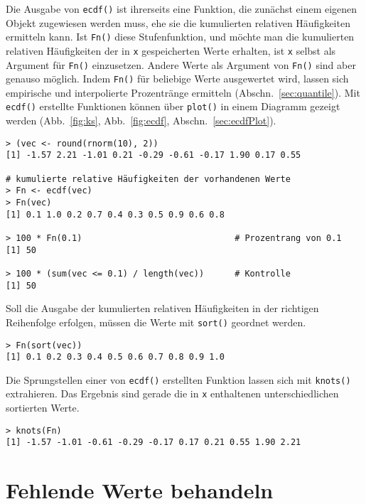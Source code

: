 Die Ausgabe von \lstinline!ecdf()! ist ihrerseits eine Funktion, die zunächst einem eigenen Objekt zugewiesen werden muss, ehe sie die kumulierten relativen Häufigkeiten ermitteln kann. Ist \lstinline!Fn()! diese Stufenfunktion, und möchte man die kumulierten relativen Häufigkeiten der in \lstinline!x! gespeicherten Werte erhalten, ist \lstinline!x! selbst als Argument für \lstinline!Fn()! einzusetzen. Andere Werte als Argument von \lstinline!Fn()! sind aber genauso möglich. Indem \lstinline!Fn()! für beliebige Werte ausgewertet wird, lassen sich empirische und interpolierte Prozentränge ermitteln (Abschn.\ \ref{sec:quantile}). Mit \lstinline!ecdf()! erstellte Funktionen können über \lstinline!plot()! in einem Diagramm gezeigt werden (Abb.\ \ref{fig:ks}, Abb.\ \ref{fig:ecdf}, Abschn.\ \ref{sec:ecdfPlot}).
\begin{lstlisting}
> (vec <- round(rnorm(10), 2))
[1] -1.57 2.21 -1.01 0.21 -0.29 -0.61 -0.17 1.90 0.17 0.55

# kumulierte relative Häufigkeiten der vorhandenen Werte
> Fn <- ecdf(vec)
> Fn(vec)
[1] 0.1 1.0 0.2 0.7 0.4 0.3 0.5 0.9 0.6 0.8

> 100 * Fn(0.1)                              # Prozentrang von 0.1
[1] 50

> 100 * (sum(vec <= 0.1) / length(vec))      # Kontrolle
[1] 50
\end{lstlisting}

Soll die Ausgabe der kumulierten relativen Häufigkeiten in der richtigen Reihenfolge erfolgen, müssen die Werte mit \lstinline!sort()! geordnet werden.
\begin{lstlisting}
> Fn(sort(vec))
[1] 0.1 0.2 0.3 0.4 0.5 0.6 0.7 0.8 0.9 1.0
\end{lstlisting}

Die Sprungstellen einer von \lstinline!ecdf()! erstellten Funktion lassen sich mit \lstinline!knots()! extrahieren. Das Ergebnis sind gerade die in \lstinline!x! enthaltenen unterschiedlichen sortierten Werte.
\begin{lstlisting}
> knots(Fn)
[1] -1.57 -1.01 -0.61 -0.29 -0.17 0.17 0.21 0.55 1.90 2.21
\end{lstlisting}

\section{Fehlende Werte behandeln}
\label{sec:na}

